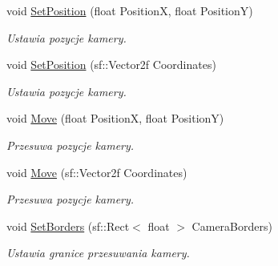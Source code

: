 \begin{DoxyCompactItemize}
\mbox{\label{classtfp_1_1_camera_aa88cf34ddd512447d4cbf56fa6a5131d}} 
void \mbox{\hyperlink{classtfp_1_1_camera_aa88cf34ddd512447d4cbf56fa6a5131d}{Set\+Position}} (float PositionX, float PositionY)
\begin{DoxyCompactList}\small\item\em Ustawia pozycje kamery. \end{DoxyCompactList}\item 
\mbox{\label{classtfp_1_1_camera_aca1637b610cda9d73f0d66e9a515b34e}} 
void \mbox{\hyperlink{classtfp_1_1_camera_aca1637b610cda9d73f0d66e9a515b34e}{Set\+Position}} (sf\+::\+Vector2f Coordinates)
\begin{DoxyCompactList}\small\item\em Ustawia pozycje kamery. \end{DoxyCompactList}\item 
\mbox{\label{classtfp_1_1_camera_ac4d8000360ea9cca17dc0370a18f311c}} 
void \mbox{\hyperlink{classtfp_1_1_camera_ac4d8000360ea9cca17dc0370a18f311c}{Move}} (float PositionX, float PositionY)
\begin{DoxyCompactList}\small\item\em Przesuwa pozycje kamery. \end{DoxyCompactList}\item 
\mbox{\label{classtfp_1_1_camera_a68ce38eb1f85a58bdc6a6aa6e18a77d8}} 
void \mbox{\hyperlink{classtfp_1_1_camera_a68ce38eb1f85a58bdc6a6aa6e18a77d8}{Move}} (sf\+::\+Vector2f Coordinates)
\begin{DoxyCompactList}\small\item\em Przesuwa pozycje kamery. \end{DoxyCompactList}\item 
\mbox{\label{classtfp_1_1_camera_a9f91e7e762a879f62301789b357d3a11}} 
void \mbox{\hyperlink{classtfp_1_1_camera_a9f91e7e762a879f62301789b357d3a11}{Set\+Borders}} (sf\+::\+Rect$<$ float $>$ Camera\+Borders)
\begin{DoxyCompactList}\small\item\em Ustawia granice przesuwania kamery. \end{DoxyCompactList}\item 
\mbox{\label{classtfp_1_1_camera_aae1ded237ac36f87d0a7683a43c1f35b}} 

\end{DoxyCompactItemize}
